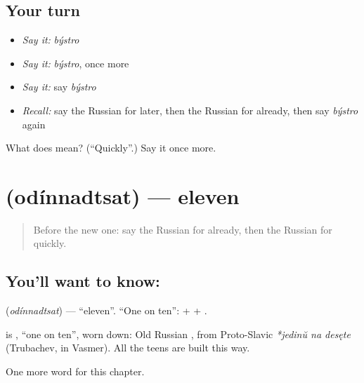 \subsection*{Your turn}
\begin{itemize}
\raggedright
  \item \emph{Say it:} \emph{býstro}
  \item \emph{Say it:} \emph{býstro}, once more
  \item \emph{Say it:} say \emph{býstro}
  \item \emph{Recall:} say the Russian for later, then the Russian for already, then say \emph{býstro} again
\end{itemize}

\begin{tcolorbox}[breakable,colback=teal!4,colframe=teal!35!black,title={Before you move on}]
What does  mean? (\textquotedblleft{}Quickly\textquotedblright{}.) Say it once more.
\end{tcolorbox}
\section[\texorpdfstring{\ru{одиннадцать} (odínnadtsat)}{одиннадцать (odínnadtsat)}]{ (odínnadtsat) — eleven}

\label{lesson:RU-C75-eleven}



\begin{quote}
Before the new one: say the Russian for already, then the Russian for quickly.
\end{quote}

\subsection*{You'll want to know: }
\textbf{} (\emph{odínnadtsat}) — \textquotedblleft{}eleven\textquotedblright{}. \textquotedblleft{}One on ten\textquotedblright{}: \textbf{} + \textbf{} + \textbf{}.

\begin{cousinweb}
\textbf{} is \emph{  }, \textquotedblleft{}one on ten\textquotedblright{}, worn down: Old Russian \emph{}, from Proto-Slavic \emph{*jedinŭ na desęte} (Trubachev, in Vasmer). All the teens are built this way.
\end{cousinweb}

\begin{grammarlens}[title={What you've built}]
One more word for this chapter.
\end{grammarlens}

